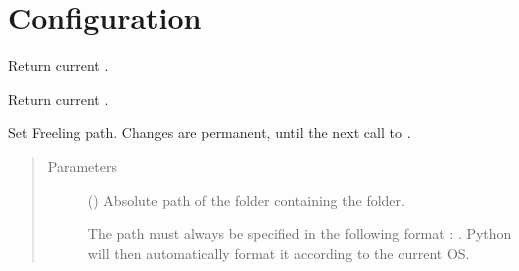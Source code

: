 \documentclass[letterpaper,10pt,english]{sphinxmanual}
\begin{document}
\chapter{Configuration}
\label{\detokenize{configuration:module-loacore.conf}}\label{\detokenize{configuration:configuration}}\label{\detokenize{configuration::doc}}

\begin{fulllineitems}
\label{\detokenize{configuration:loacore.conf.check_freeling_path}}
Return current .

\end{fulllineitems}


\begin{fulllineitems}
\label{\detokenize{configuration:loacore.conf.check_lang}}
Return current .

\end{fulllineitems}


\begin{fulllineitems}
\label{\detokenize{configuration:loacore.conf.set_freeling_path}}
Set Freeling path.
Changes are permanent, until the next call to {\hyperref[\detokenize{configuration:loacore.conf.set_freeling_path}]{}}.
\begin{quote}\begin{description}
\item[{Parameters}] \leavevmode
{} () \textendash{} 
Absolute path of the folder containing the  folder.

The path must always be specified in the following format :  .
Python will then automatically format it according to the current OS.


\end{description}\end{quote}

\end{fulllineitems}
\end{document}
